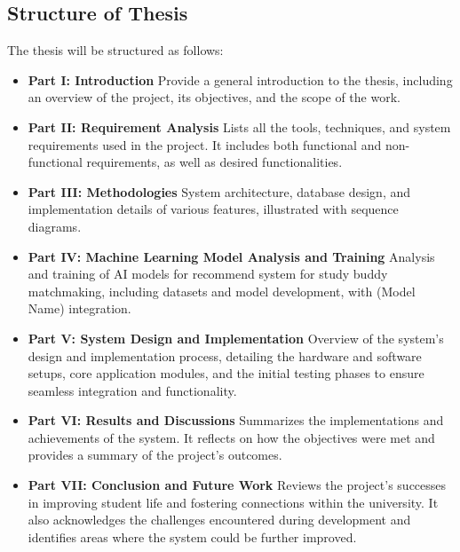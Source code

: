 \documentclass[12pt]{article}
\begin{document}
\subsection{Structure of Thesis}
The thesis will be structured as follows:
\begin{itemize}
    \item \textbf{Part I: Introduction }
    \newline
    Provide a general introduction to the thesis, including an overview of the project, its objectives, and the scope of the work.
    \item \textbf{Part II: Requirement Analysis }
    \newline
    Lists all the tools, techniques, and system requirements used in the project. It includes
    both functional and non-functional requirements, as well as desired functionalities.
    \item \textbf{Part III: Methodologies }
    \newline
    System architecture, database design, and implementation details of various features, illustrated with sequence diagrams.
    \item \textbf{Part IV: Machine Learning Model Analysis and Training }
    \newline
    Analysis and training of AI models for recommend system for study buddy matchmaking, including datasets and model development, with (Model Name) integration.
    \item \textbf{Part V: System Design and Implementation }
    \newline
    Overview of the system's design and implementation process, detailing the hardware and software setups, core application modules, and the initial testing phases to ensure seamless integration and functionality.
    \item \textbf{Part VI: Results and Discussions }
    \newline 
    Summarizes the implementations and achievements of the system. It reflects on how the
    objectives were met and provides a summary of the project's outcomes.
    \item \textbf{Part VII: Conclusion and Future Work }
    \newline
    Reviews the project's successes in improving student life and fostering connections within the university.
    It also acknowledges the challenges encountered during development and identifies areas where the system could be further improved.
\end{itemize}
\end{document}
